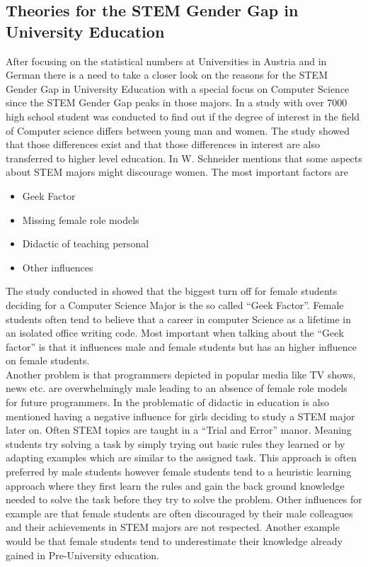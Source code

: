 \documentclass[12pt]{article}
\begin{document}
\subsection{Theories for the STEM Gender Gap in University Education}
\label{theories}
After focusing on the statistical numbers at Universities in Austria and in German there is a need to take a closer look on the reasons for the STEM Gender Gap in University Education with a special focus on Computer Science since the STEM Gender Gap peaks in those majors.
In \cite{chan} a study with over 7000 high school student was conducted to find out if the degree of interest in the field of Computer science differs between young man and women. The study showed that those differences exist and that those differences in interest are also transferred to higher level education. \newline
In \cite{schneider} W. Schneider mentions that some aspects about STEM majors might discourage women. The most important factors are
\begin{itemize}
	\item Geek Factor
	\item Missing female role models
	\item Didactic of teaching personal
	\item Other influences 
\end{itemize}
The study conducted in \cite{chan} showed that the biggest turn off for female students deciding for a Computer Science Major is the so called ``Geek Factor''. Female students often tend to believe that a career in computer Science as a lifetime in an isolated office writing code. Most important when talking about the ``Geek factor'' is that it influences male and female students but has an higher influence on female students. \\

Another problem is that programmers depicted in popular media like TV shows, news etc. are overwhelmingly male leading to an absence of female role models for future programmers.
In \cite{diff} the problematic of didactic in education is also mentioned having a negative influence for girls deciding to study a STEM major later on. Often STEM topics are taught in a ``Trial and Error'' manor. Meaning students try solving a task by simply trying out basic rules they learned or by adapting examples which are similar to the assigned task. This approach is often preferred by male students however female students tend to a heuristic learning approach where they first learn the rules and gain the back ground knowledge needed to solve the task before they try to solve the problem. \newline  
Other influences for example are that female students are often discouraged by their male colleagues and their achievements in STEM majors are not respected. Another example would be that female students tend to underestimate their knowledge already gained in Pre-University education.


\newline


\newpage
\listoffigures
\listoftables
\end{document}
